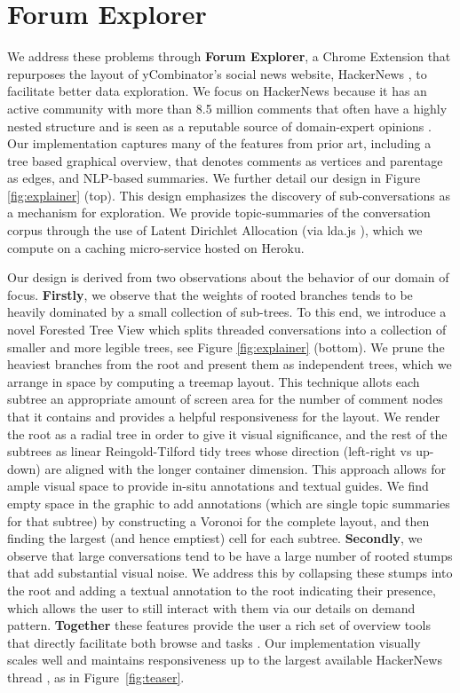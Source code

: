 \documentclass{egpubl}
\begin{document}
\section{Forum Explorer}

We address these problems through \textbf{Forum Explorer}, a Chrome Extension that repurposes the layout of yCombinator's social news website, HackerNews \cite{hackernews}, to facilitate better data exploration.
%
We focus on HackerNews because it has an active community with more than 8.5 million comments that often have a highly nested structure and is seen as a reputable source of domain-expert opinions \cite{barik2015heart}.
%
Our implementation captures many of the features from prior art, including a tree based graphical overview, that denotes comments as vertices and parentage as edges, and NLP-based summaries.
%
We further detail our design in Figure \ref{fig:explainer} (top). 
%
This design emphasizes the discovery of sub-conversations as a mechanism for exploration.
%
We provide topic-summaries of the conversation corpus through the use of Latent Dirichlet Allocation (via lda.js \cite{lda-js}), which we compute on a caching micro-service hosted on Heroku. 



Our design is derived from two observations about the behavior of our domain of focus.
%
\textbf{Firstly}, we observe that the weights of rooted branches tends to be heavily dominated by a small collection of sub-trees.
%
To this end, we introduce a novel Forested Tree View which splits threaded conversations into a collection of smaller and more legible trees, see Figure \ref{fig:explainer} (bottom).
%
We prune the heaviest branches from the root and present them as independent trees, which we arrange in space by computing a treemap layout.
%
This technique allots each subtree an appropriate amount of screen area for the number of comment nodes that it contains and provides a helpful responsiveness for the layout.
%
We render the root as a radial tree in order to give it visual significance, and the rest of the subtrees as linear Reingold-Tilford tidy trees whose direction (left-right vs up-down) are aligned with the longer container dimension.
%
This approach allows for ample visual space to provide in-situ annotations and textual guides. 
%
We find empty space in the graphic to add annotations (which are single topic summaries for that subtree) by constructing a Voronoi for the complete layout, and then finding the largest (and hence emptiest) cell for each subtree.
%
\textbf{Secondly}, we observe that large conversations tend to be have a large number of rooted stumps that add substantial visual noise.
%
We address this by collapsing these stumps into the root and adding a textual annotation to the root indicating their presence, which allows the user to still interact with them via our details on demand pattern.
%
\textbf{Together} these features provide the user a rich set of overview tools that directly facilitate both browse and  tasks \cite{brehmer2013multi}.
%
Our implementation visually scales well and maintains responsiveness up to the largest available HackerNews thread \cite{hackernews-biggest}, as in Figure~\ref{fig:teaser}.
\end{document}
